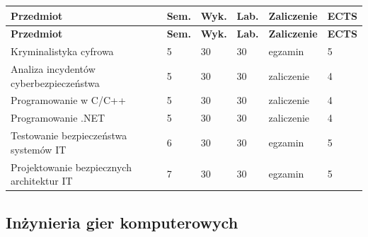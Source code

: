 \documentclass[12pt,a4paper]{article}
\newcommand{\thdrule}{\noalign{\global\setlength{\extrarowheight}{0pt}}}
\newcommand{\thdend}{\noalign{\global\setlength{\extrarowheight}{4pt}}}
\begin{document}
{\scriptsize
\begin{longtable}{m{6.5cm}m{0.7cm}m{1cm}m{1cm}m{1.7cm}m{0.7cm}}
\thdrule\toprule
\rowcolor{pjatkRed}
{\color{white}\footnotesize\textbf{\vphantom{Ag}Przedmiot}} & {\color{white}\footnotesize\textbf{\vphantom{Ag}Sem.}} & {\color{white}\footnotesize\textbf{\vphantom{Ag}Wyk.}} & {\color{white}\footnotesize\textbf{\vphantom{Ag}Lab.}} & {\color{white}\footnotesize\textbf{\vphantom{Ag}Zaliczenie}} & {\color{white}\footnotesize\textbf{\vphantom{Ag}ECTS}} \\
\midrule\thdend
\endfirsthead
\thdrule\toprule
\rowcolor{pjatkRed}
{\color{white}\footnotesize\textbf{\vphantom{Ag}Przedmiot}} & {\color{white}\footnotesize\textbf{\vphantom{Ag}Sem.}} & {\color{white}\footnotesize\textbf{\vphantom{Ag}Wyk.}} & {\color{white}\footnotesize\textbf{\vphantom{Ag}Lab.}} & {\color{white}\footnotesize\textbf{\vphantom{Ag}Zaliczenie}} & {\color{white}\footnotesize\textbf{\vphantom{Ag}ECTS}} \\
\midrule\thdend
\endhead
\rowcolor{tableRowLight} Kryminalistyka cyfrowa & 5 & 30 & 30 & {\scriptsize egzamin} & 5 \\
\rowcolor{tableRowAlt} Analiza incydentów cyberbezpieczeństwa & 5 & 30 & 30 & {\scriptsize zaliczenie} & 4 \\
\rowcolor{tableRowLight} Programowanie w C/C++ & 5 & 30 & 30 & {\scriptsize zaliczenie} & 4 \\
\rowcolor{tableRowAlt} Programowanie .NET & 5 & 30 & 30 & {\scriptsize zaliczenie} & 4 \\
\rowcolor{tableRowLight} Testowanie bezpieczeństwa systemów IT & 6 & 30 & 30 & {\scriptsize egzamin} & 5 \\
\rowcolor{tableRowAlt} Projektowanie bezpiecznych architektur IT & 7 & 30 & 30 & {\scriptsize egzamin} & 5 \\
\bottomrule
\end{longtable}}

\subsection*{Inżynieria gier komputerowych}
\end{document}
